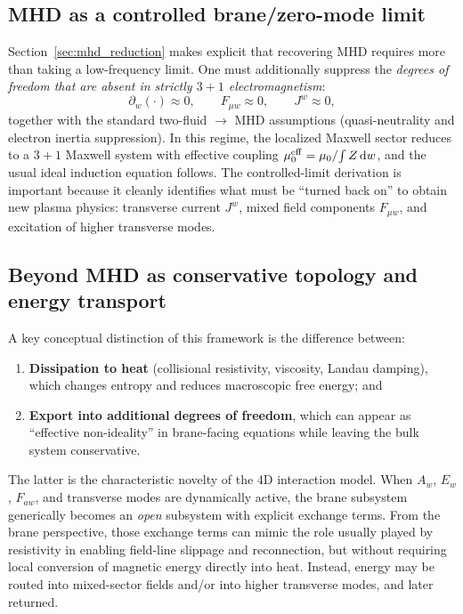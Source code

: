 \documentclass[11pt]{article}
\newcommand{\Z}{Z}              %
\begin{document}
\subsection{MHD as a controlled brane/zero-mode limit}
Section~\ref{sec:mhd_reduction} makes explicit that recovering MHD requires more than
taking a low-frequency limit. One must additionally suppress the \emph{degrees of freedom
that are absent in strictly \(3+1\) electromagnetism}:
\begin{equation}
\partial_w(\cdot)\approx 0,
\qquad
F_{\mu w}\approx 0,
\qquad
J^w\approx 0,
\label{eq:discussion_mhd_assumptions}
\end{equation}
together with the standard two-fluid \(\to\) MHD assumptions (quasi-neutrality and
electron inertia suppression). In this regime, the localized Maxwell sector reduces to
a \(3+1\) Maxwell system with effective coupling \(\mu_0^{\rm eff}=\mu_0/\!\int\Z\,\dd w\),
and the usual ideal induction equation follows. The controlled-limit derivation is
important because it cleanly identifies what must be ``turned back on'' to obtain
new plasma physics: transverse current \(J^w\), mixed field components \(F_{\mu w}\),
and excitation of higher transverse modes.

\subsection{Beyond MHD as conservative topology and energy transport}
A key conceptual distinction of this framework is the difference between:
\begin{enumerate}[leftmargin=1.6em]
\item \textbf{Dissipation to heat} (collisional resistivity, viscosity, Landau damping),
which changes entropy and reduces macroscopic free energy; and
\item \textbf{Export into additional degrees of freedom}, which can appear as
``effective non-ideality'' in brane-facing equations while leaving the bulk system
conservative.
\end{enumerate}
The latter is the characteristic novelty of the \(4\)D interaction model. When
\(A_w\), \(E_w\), \(F_{aw}\), and transverse modes are dynamically active, the brane
subsystem generically becomes an \emph{open} subsystem with explicit exchange terms.
From the brane perspective, those exchange terms can mimic the role usually played
by resistivity in enabling field-line slippage and reconnection, but without requiring
local conversion of magnetic energy directly into heat. Instead, energy may be routed
into mixed-sector fields and/or into higher transverse modes, and later returned.
\end{document}
